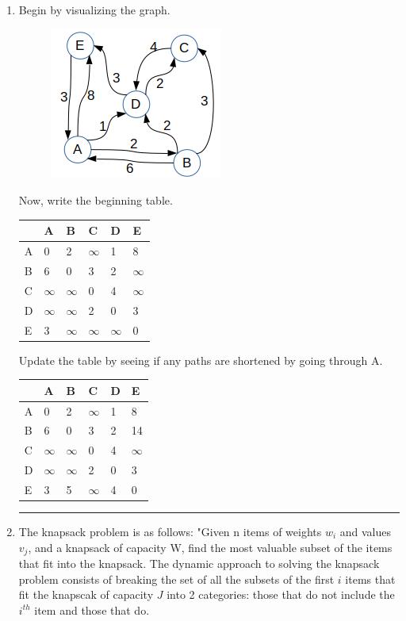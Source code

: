 \documentclass{article}
\begin{document}
\begin{enumerate}
\item 
Begin by visualizing the graph. 

\begin{figure}[H]
	\includegraphics[]{P4/graph}
\end{figure}

Now, write the beginning table. 
\begin{table}[H]
\begin{tabular}{|l|l|l|l|l|l|}
\hline
 & A & B & C & D & E \\ \hline
A & 0 & 2 & $\infty$ & 1 & 8 \\ \hline
B & 6 & 0 & 3 & 2 & $\infty$ \\ \hline
C & $\infty$ & $\infty$ & 0 & 4 & $\infty$ \\ \hline
D & $\infty$ & $\infty$ & 2 & 0 & 3 \\ \hline
E & 3 & $\infty$ & $\infty$ & $\infty$ & 0 \\ \hline
\end{tabular}
\end{table}

Update the table by seeing if any paths are shortened by going through A. 

\begin{table}[H]
\begin{tabular}{|l|l|l|l|l|l|}
\hline
 & A & B & C & D & E \\ \hline
A & 0 & 2 & $\infty$ & 1 & 8 \\ \hline
B & 6 & 0 & 3 & 2 & 14 \\ \hline
C & $\infty$ & $\infty$ & 0 & 4 & $\infty$ \\ \hline
D & $\infty$ & $\infty$ & 2 & 0 & 3 \\ \hline
E & 3 & 5 & $\infty$ & 4 & 0 \\ \hline
\end{tabular}
\end{table}

\noindent\rule{8cm}{0.4pt}

\item The knapsack problem is as follows: "Given n items of weights $w_i$ and values $v_j$, and a knapsack of capacity W, find the most valuable subset of the items that fit into the knapsack. The dynamic approach to solving the knapsack problem consists of breaking the set of all the subsets of the first $i$ items that fit the knapscak of capacity $J$ into 2 categories: those that do not include the $i^{th}$ item and those that do. 


\end{enumerate}
\end{document}

